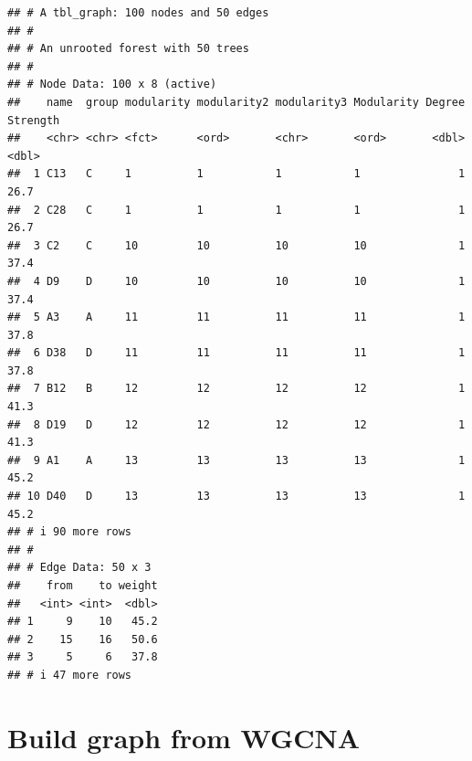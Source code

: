 \documentclass[
]{book}
\begin{document}
\begin{verbatim}
## # A tbl_graph: 100 nodes and 50 edges
## #
## # An unrooted forest with 50 trees
## #
## # Node Data: 100 x 8 (active)
##    name  group modularity modularity2 modularity3 Modularity Degree Strength
##    <chr> <chr> <fct>      <ord>       <chr>       <ord>       <dbl>    <dbl>
##  1 C13   C     1          1           1           1               1     26.7
##  2 C28   C     1          1           1           1               1     26.7
##  3 C2    C     10         10          10          10              1     37.4
##  4 D9    D     10         10          10          10              1     37.4
##  5 A3    A     11         11          11          11              1     37.8
##  6 D38   D     11         11          11          11              1     37.8
##  7 B12   B     12         12          12          12              1     41.3
##  8 D19   D     12         12          12          12              1     41.3
##  9 A1    A     13         13          13          13              1     45.2
## 10 D40   D     13         13          13          13              1     45.2
## # i 90 more rows
## #
## # Edge Data: 50 x 3
##    from    to weight
##   <int> <int>  <dbl>
## 1     9    10   45.2
## 2    15    16   50.6
## 3     5     6   37.8
## # i 47 more rows
\end{verbatim}

\section{Build graph from WGCNA}\label{build-graph-from-wgcna}
\end{document}
